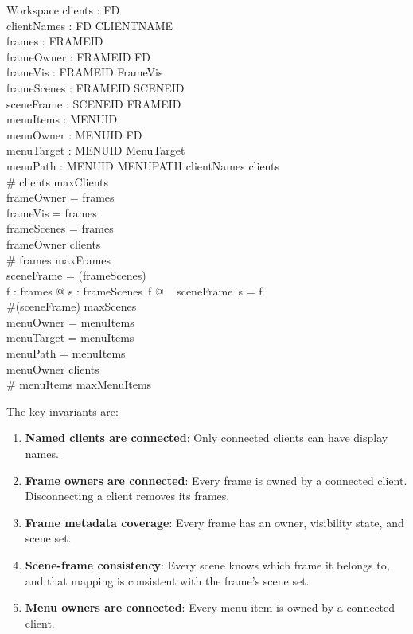 \documentclass[a4paper,10pt,fleqn]{article}
\begin{document}
\begin{schema}{Workspace}
  clients : \power FD \\
  clientNames : FD \pfun CLIENTNAME \\
  frames : \power FRAMEID \\
  frameOwner : FRAMEID \pfun FD \\
  frameVis : FRAMEID \pfun FrameVis \\
  frameScenes : FRAMEID \pfun \power SCENEID \\
  sceneFrame : SCENEID \pfun FRAMEID \\
  menuItems : \power MENUID \\
  menuOwner : MENUID \pfun FD \\
  menuTarget : MENUID \pfun MenuTarget \\
  menuPath : MENUID \pfun MENUPATH
  \where
  \dom clientNames \subseteq clients \\
  \# clients \leq maxClients \\
  \dom frameOwner = frames \\
  \dom frameVis = frames \\
  \dom frameScenes = frames \\
  \ran frameOwner \subseteq clients \\
  \# frames \leq maxFrames \\
  \dom sceneFrame = \bigcup (\ran frameScenes) \\
  \forall f : frames @ \forall s : frameScenes~f @
  \quad~ sceneFrame~s = f \\
  \#(\dom sceneFrame) \leq maxScenes \\
  \dom menuOwner = menuItems \\
  \dom menuTarget = menuItems \\
  \dom menuPath = menuItems \\
  \ran menuOwner \subseteq clients \\
  \# menuItems \leq maxMenuItems
\end{schema}

The key invariants are:
\begin{enumerate}
  \item \textbf{Named clients are connected}: Only connected
    clients can have display names.
  \item \textbf{Frame owners are connected}: Every frame is owned
    by a connected client.  Disconnecting a client removes its frames.
  \item \textbf{Frame metadata coverage}: Every frame has an owner,
    visibility state, and scene set.
  \item \textbf{Scene-frame consistency}: Every scene knows which
    frame it belongs to, and that mapping is consistent with the
    frame's scene set.
  \item \textbf{Menu owners are connected}: Every menu item is
    owned by a connected client.
\end{enumerate}
\end{document}
